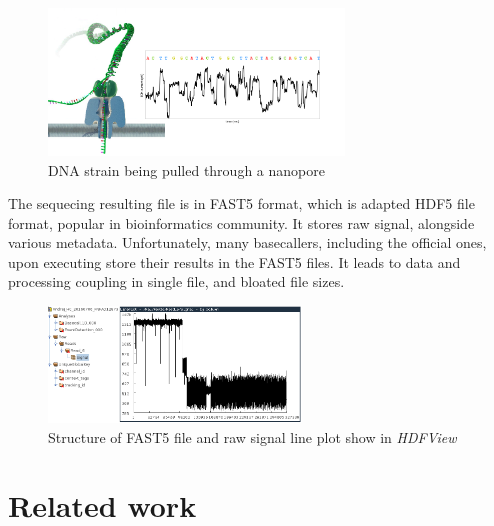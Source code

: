 \documentclass[times, utf8, diplomski, english]{fer}
\begin{document}
\begin{figure}[!ht]
    \begin{center}
        \includegraphics[width=0.7\textwidth]{nanopore}
        
        \caption[DNA strain being pulled through a nanopore]{DNA strain being pulled through a nanopore \protect\footnotemark}
        \label{fg:nanopore}
    \end{center}
\end{figure}

The sequecing resulting file is in FAST5 format, which is adapted HDF5 file format, popular in bioinformatics community. It stores raw signal, alongside various metadata. Unfortunately, many basecallers, including the official ones, upon executing store their results in the FAST5 files. It leads to data and processing coupling in single file, and bloated file sizes. 

\begin{figure}[!ht]
    \begin{center}
        \includegraphics[width=0.6\textwidth]{fast5_sample}
        \caption[Structure of FAST5 file and raw signal plot show in \textit{HDFView}]{Structure of FAST5 file and raw signal line plot show in \textit{HDFView} \protect\footnotemark}
        \label{fg:fast5}
    \end{center}
\end{figure}
  
\section{Related work}
\end{document}
